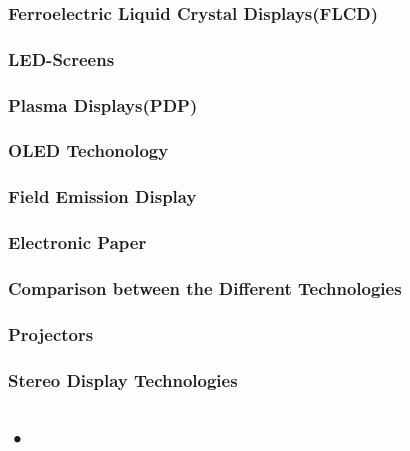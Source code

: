 \documentclass{standalone}
\begin{document}
\subsubsection*{Ferroelectric Liquid Crystal Displays(FLCD)}
\subsubsection*{LED-Screens}
\subsubsection*{Plasma Displays(PDP)}
\subsubsection*{OLED Techonology}
\subsubsection*{Field Emission Display}
\subsubsection*{Electronic Paper}
\subsubsection*{Comparison between the Different Technologies}

\subsubsection{Projectors}
\subsubsection{Stereo Display Technologies}









\subsection{•}
\end{document}
